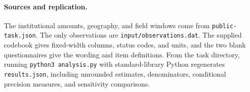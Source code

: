 \documentclass[11pt]{article}
\begin{document}
\paragraph{Sources and replication.}
The institutional amounts, geography, and field windows come from
\texttt{public-task.json}. The only observations are
\texttt{input/observations.dat}. The supplied codebook gives fixed-width
columns, status codes, and units, and the two blank questionnaires give
the wording and item definitions. From the task directory, running
\texttt{python3 analysis.py} with standard-library Python regenerates
\texttt{results.json}, including unrounded estimates, denominators,
conditional precision measures, and sensitivity comparisons.
\end{document}
